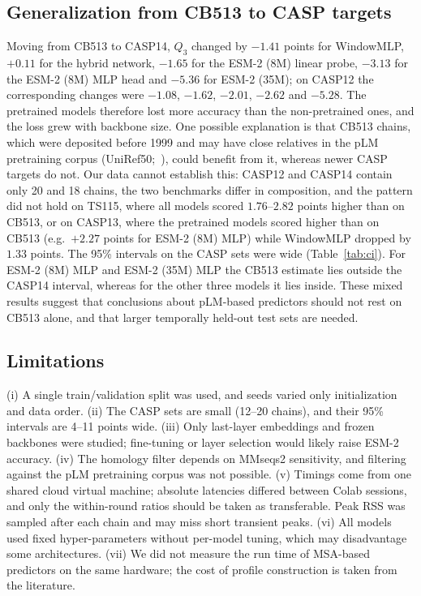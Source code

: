 \documentclass[preprint,12pt,authoryear]{elsarticle}
\begin{document}
\subsection{Generalization from CB513 to CASP targets}
Moving from CB513 to CASP14, $Q_3$ changed by $-1.41$ points for WindowMLP, $+0.11$ for the hybrid network, $-1.65$ for the ESM-2 (8M) linear probe, $-3.13$ for the ESM-2 (8M) MLP head and $-5.36$ for ESM-2 (35M); on CASP12 the corresponding changes were $-1.08$, $-1.62$, $-2.01$, $-2.62$ and $-5.28$. The pretrained models therefore lost more accuracy than the non-pretrained ones, and the loss grew with backbone size. One possible explanation is that CB513 chains, which were deposited before 1999 and may have close relatives in the pLM pretraining corpus (UniRef50;~\citealp{suzek2015uniref}), could benefit from it, whereas newer CASP targets do not. Our data cannot establish this: CASP12 and CASP14 contain only 20 and 18 chains, the two benchmarks differ in composition, and the pattern did not hold on TS115, where all models scored $1.76$--$2.82$ points higher than on CB513, or on CASP13, where the pretrained models scored higher than on CB513 (e.g.\ $+2.27$ points for ESM-2 (8M) MLP) while WindowMLP dropped by $1.33$ points. The 95\% intervals on the CASP sets were wide (Table~\ref{tab:ci}). For ESM-2 (8M) MLP and ESM-2 (35M) MLP the CB513 estimate lies outside the CASP14 interval, whereas for the other three models it lies inside. These mixed results suggest that conclusions about pLM-based predictors should not rest on CB513 alone, and that larger temporally held-out test sets are needed.

\subsection{Limitations}
(i) A single train/validation split was used, and seeds varied only initialization and data order. (ii) The CASP sets are small (12--20 chains), and their 95\% intervals are 4--11 points wide. (iii) Only last-layer embeddings and frozen backbones were studied; fine-tuning or layer selection would likely raise ESM-2 accuracy. (iv) The homology filter depends on MMseqs2 sensitivity, and filtering against the pLM pretraining corpus was not possible. (v) Timings come from one shared cloud virtual machine; absolute latencies differed between Colab sessions, and only the within-round ratios should be taken as transferable. Peak RSS was sampled after each chain and may miss short transient peaks. (vi) All models used fixed hyper-parameters without per-model tuning, which may disadvantage some architectures. (vii) We did not measure the run time of MSA-based predictors on the same hardware; the cost of profile construction is taken from the literature.
\end{document}
